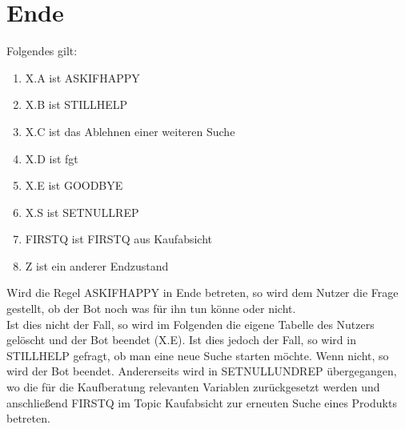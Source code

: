 \section{Ende}
\label{sec:Ende}

Folgendes gilt:

\begin{enumerate}
\item{X.A ist ASKIFHAPPY}
\item{X.B ist STILLHELP}
\item{X.C ist das Ablehnen einer weiteren Suche}
\item{X.D ist fgt} %
\item{X.E ist GOODBYE}
\item{X.S ist SETNULLREP}
\item{FIRSTQ ist FIRSTQ aus Kaufabsicht}
\item{Z ist ein anderer Endzustand}
\end{enumerate}

Wird die Regel ASKIFHAPPY in Ende betreten, so wird dem Nutzer die Frage gestellt, ob der Bot noch was für ihn tun könne oder nicht.\\
Ist dies nicht der Fall, so wird im Folgenden die eigene Tabelle des Nutzers gelöscht und der Bot beendet (X.E). Ist dies jedoch der Fall, so wird in STILLHELP gefragt, ob man eine neue Suche starten möchte. Wenn nicht, so wird der Bot beendet. Andererseits wird in SETNULLUNDREP übergegangen, wo die für die Kaufberatung relevanten Variablen zurückgesetzt werden und anschließend FIRSTQ im Topic Kaufabsicht zur erneuten Suche eines Produkts betreten. 

